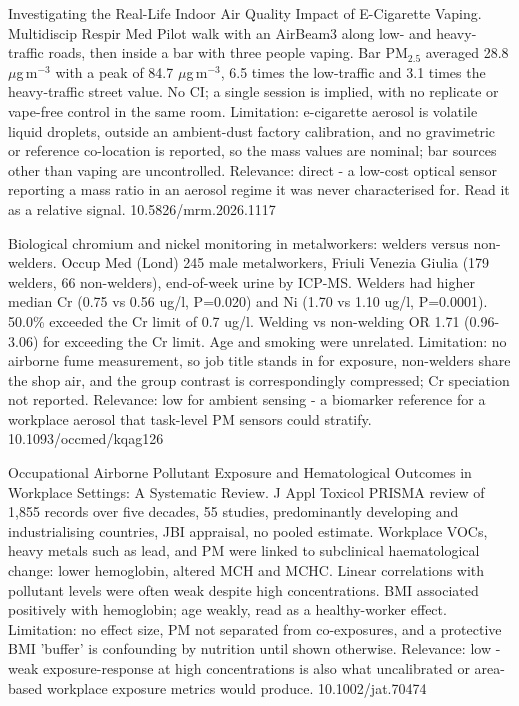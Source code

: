 \documentclass[10pt]{article}
\begin{document}
{Investigating the Real-Life Indoor Air Quality Impact of E-Cigarette Vaping.}
{Multidiscip Respir Med}
{Pilot walk with an AirBeam3 along low- and heavy-traffic roads, then inside a bar with three people vaping. Bar PM$_{2.5}$ averaged 28.8 $\mu$g\,m$^{-3}$ with a peak of 84.7 $\mu$g\,m$^{-3}$, 6.5 times the low-traffic and 3.1 times the heavy-traffic street value. No CI; a single session is implied, with no replicate or vape-free control in the same room. Limitation: e-cigarette aerosol is volatile liquid droplets, outside an ambient-dust factory calibration, and no gravimetric or reference co-location is reported, so the mass values are nominal; bar sources other than vaping are uncontrolled. Relevance: direct - a low-cost optical sensor reporting a mass ratio in an aerosol regime it was never characterised for. Read it as a relative signal.}
{10.5826/mrm.2026.1117}

{Biological chromium and nickel monitoring in metalworkers: welders versus non-welders.}
{Occup Med (Lond)}
{245 male metalworkers, Friuli Venezia Giulia (179 welders, 66 non-welders), end-of-week urine by ICP-MS. Welders had higher median Cr (0.75 vs 0.56 ug/l, P=0.020) and Ni (1.70 vs 1.10 ug/l, P=0.0001). 50.0\% exceeded the Cr limit of 0.7 ug/l. Welding vs non-welding OR 1.71 (0.96-3.06) for exceeding the Cr limit. Age and smoking were unrelated. Limitation: no airborne fume measurement, so job title stands in for exposure, non-welders share the shop air, and the group contrast is correspondingly compressed; Cr speciation not reported. Relevance: low for ambient sensing - a biomarker reference for a workplace aerosol that task-level PM sensors could stratify.}
{10.1093/occmed/kqag126}

{Occupational Airborne Pollutant Exposure and Hematological Outcomes in Workplace Settings: A Systematic Review.}
{J Appl Toxicol}
{PRISMA review of 1,855 records over five decades, 55 studies, predominantly developing and industrialising countries, JBI appraisal, no pooled estimate. Workplace VOCs, heavy metals such as lead, and PM were linked to subclinical haematological change: lower hemoglobin, altered MCH and MCHC. Linear correlations with pollutant levels were often weak despite high concentrations. BMI associated positively with hemoglobin; age weakly, read as a healthy-worker effect. Limitation: no effect size, PM not separated from co-exposures, and a protective BMI 'buffer' is confounding by nutrition until shown otherwise. Relevance: low - weak exposure-response at high concentrations is also what uncalibrated or area-based workplace exposure metrics would produce.}
{10.1002/jat.70474}
\end{document}
